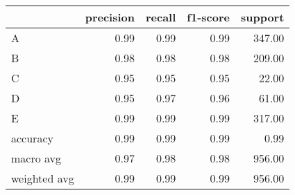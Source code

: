 \begin{tabular}{|l|r|r|r|r|}
\hline
{} &  precision &  recall &  f1-score &  support \\
\hline
A            &       0.99 &    0.99 &      0.99 &   347.00 \\
B            &       0.98 &    0.98 &      0.98 &   209.00 \\
C            &       0.95 &    0.95 &      0.95 &    22.00 \\
D            &       0.95 &    0.97 &      0.96 &    61.00 \\
E            &       0.99 &    0.99 &      0.99 &   317.00 \\
accuracy     &       0.99 &    0.99 &      0.99 &     0.99 \\
macro avg    &       0.97 &    0.98 &      0.98 &   956.00 \\
weighted avg &       0.99 &    0.99 &      0.99 &   956.00 \\
\hline
\end{tabular}

